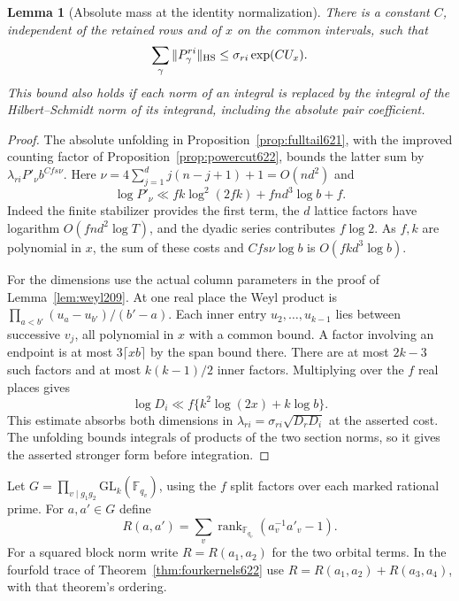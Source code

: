 \documentclass[a4paper,11pt]{article}
\newtheorem{lemma}[proposition]{Lemma}
\theoremstyle{definition}
\theoremstyle{remark}
\numberwithin{equation}{section}
\begin{document}
\begin{lemma}[Absolute mass at the identity normalization]
\leavevmode\label{lem:massranks623}
There is a constant \(C\), independent of the retained rows and of
\(x\) on the common intervals, such that
\[
       \sum_\gamma \|P_\gamma^{ri}\|_{\rm HS}
                    \le \sigma_{ri}\exp(CU_x).
\]
This bound also holds if each norm of an integral is replaced by
the integral of the Hilbert--Schmidt norm of its integrand,
including the absolute pair coefficient.
\end{lemma}
\begin{proof}
The absolute unfolding in Proposition~\ref{prop:fulltail621},
with the improved counting factor of Proposition~\ref{prop:powercut622},
bounds the latter sum by \(\lambda_{ri}P'_\nu b^{Cfs\nu}\).
Here \(\nu=4\sum_{j=1}^d j(n-j+1)+1=O(nd^2)\) and
\[
  \log P'_\nu\ll fk\log^2(2fk)+fnd^3\log b+f .
\]
Indeed the finite stabilizer provides the first term, the \(d\)
lattice factors have logarithm \(O(fn d^2\log T)\), and the
dyadic series contributes \(f\log2\). As \(f,k\) are polynomial
in \(x\), the sum of these costs and \(Cfs\nu\log b\) is
\(O(fk d^3\log b)\).

For the dimensions use the actual column parameters in the proof
of Lemma~\ref{lem:weyl209}. At one real place the Weyl product
is \(\prod_{a<b'}(u_a-u_{b'})/(b'-a)\). Each inner entry
\(u_2,\ldots,u_{k-1}\) lies between successive \(v_j\), all
polynomial in \(x\) with a common bound. A factor involving
an endpoint is at most \(3\lceil xb\rceil\) by the span bound
there. There are at most \(2k-3\) such factors and at most
\(k(k-1)/2\) inner factors. Multiplying over the \(f\) real
places gives
\[
          \log D_i\ll f\{k^2\log(2x)+k\log b\}.
\]
This estimate absorbs both dimensions in
\(\lambda_{ri}=\sigma_{ri}\sqrt{D_rD_i}\) at the asserted cost.
The unfolding bounds integrals of products of the two section
norms, so it gives the asserted stronger form before integration.
\end{proof}

Let \(G=\prod_{v\mid g_1g_2}\mathrm{GL}_k(\mathbb F_{q_v})\),
using the \(f\) split factors over each marked rational prime.
For \(a,a'\in G\) define
\[
       R(a,a')=\sum_v\operatorname{rank}_{\mathbb F_{q_v}}
                         (a_v^{-1}a'_v-1).
\]
For a squared block norm write \(R=R(a_1,a_2)\) for the two
orbital terms. In the fourfold trace of
Theorem~\ref{thm:fourkernels622} use
\(R=R(a_1,a_2)+R(a_3,a_4)\), with that theorem's ordering.
\end{document}
